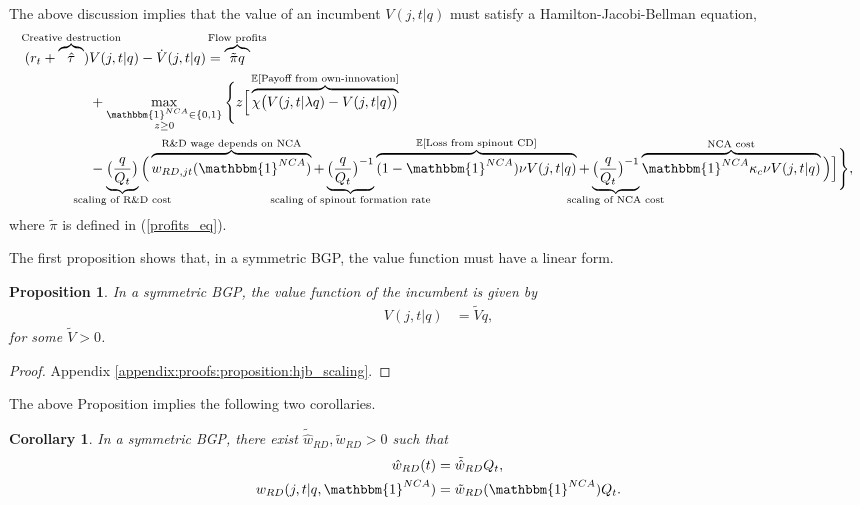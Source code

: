 \documentclass[11pt,english]{article}
\newtheorem{proposition}{Proposition}
\newtheorem{proposition_corollary}{Corollary}[proposition]
\theoremstyle{definition}
\begin{document}
The above discussion implies that the value of an incumbent $V(j,t|q)$ must satisfy a Hamilton-Jacobi-Bellman equation,
\begin{align}
(r_t + \overbrace{\hat{\tau}}^{\mathclap{\text{Creative destruction}}}) &V(j,t |q) - \dot{V}(j,t|q) = \overbrace{\tilde{\pi} q }^{\mathclap{\text{Flow profits}}}\nonumber \\_{}
&+ \max_{\substack{\mathbbm{1}^{NCA} \in \{0,1\} \\ z \ge 0}} \Bigg\{ z \Big[  \overbrace{\chi \big( V(j,t|\lambda q) - V(j,t|q)\big)}^{\mathclap{\mathbb{E}[\text{Payoff from own-innovation}]}}  \nonumber \\
&- \underbrace{\big(\frac{q}{Q_t}\big)}_{\mathclap{\text{scaling of R\&D cost}}} \Big( \overbrace{w_{RD,jt}(\mathbbm{1}^{NCA})}^{\mathclap{\text{R\&D wage depends on NCA}}} + \underbrace{\big(\frac{q}{Q_t}\big)^{-1}}_{\mathclap{\text{scaling of spinout formation rate}}} \overbrace{(1-\mathbbm{1}^{NCA}) \nu V(j,t|q)}^{\mathclap{\mathbb{E}[\text{Loss from spinout CD}]}} + \underbrace{\big(\frac{q}{Q_t}\big)^{-1}}_{\mathclap{\text{scaling of NCA cost}}}  \overbrace{\mathbbm{1}^{NCA} \kappa_c \nu V(j,t|q) }^{\mathclap{\text{NCA cost}}}\Big)  \Big] \Bigg\}, \label{eq:hjb_incumbent_0}
\end{align}
where $\tilde{\pi}$ is defined in (\ref{profits_eq}). 

The first proposition shows that, in a symmetric BGP, the value function must have a linear form.

\begin{proposition}\label{proposition:hjb_scaling}
	In a symmetric BGP, the value function of the incumbent is given by
	\begin{align*}
		V(j,t|q) &= \tilde{V} q,
	\end{align*}
	for some $\tilde{V} > 0$.
\end{proposition}

\begin{proof}
	Appendix \ref{appendix:proofs:proposition:hjb_scaling}.
\end{proof}


The above Proposition implies the following two corollaries.



\begin{proposition_corollary}
	In a symmetric BGP, there exist $\tilde{\hat{w}}_{RD}, \tilde{w}_{RD} > 0$ such that
	\begin{align*}
	\hat{w}_{RD}(t) &= \tilde{\hat{w}}_{RD} Q_t, \\
	w_{RD}(j,t|q,\mathbbm{1}^{NCA}) &= \tilde{w}_{RD}(\mathbbm{1}^{NCA}) Q_t.
	\end{align*}
\end{proposition_corollary}
\end{document}
